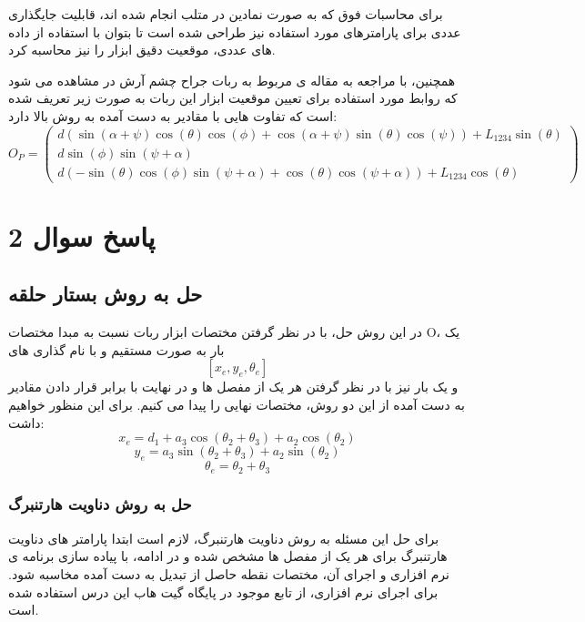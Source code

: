 برای محاسبات فوق که به صورت نمادین در متلب انجام شده اند، قابلیت جایگذاری عددی برای پارامترهای مورد استفاده نیز طراحی شده است تا بتوان با استفاده از داده های عددی، موقعیت دقیق ابزار را نیز محاسبه کرد.

همچنین، با مراجعه به مقاله ی مربوط به ربات جراح چشم آرش در \cite{hassani2021kinematic} مشاهده می شود که روابط مورد استفاده برای تعیین موقعیت ابزار این ربات به صورت زیر تعریف شده است که تفاوت هایی با مقادیر به دست آمده به روش بالا دارد:
\[
O_P = 
\begin{pmatrix}
	d \left( \sin(\alpha + \psi) \cos(\theta) \cos(\phi) + \cos(\alpha + \psi) \sin(\theta) \cos(\psi) \right) + L_{1234} \sin(\theta) \\
	d \sin(\phi) \sin(\psi + \alpha) \\
	d \left( -\sin(\theta) \cos(\phi) \sin(\psi + \alpha) + \cos(\theta) \cos(\psi + \alpha) \right) + L_{1234} \cos(\theta)
\end{pmatrix}
\]


\section{ پاسخ سوال 2}
\subsection{حل به روش بستار حلقه}

در این روش حل، با در نظر گرفتن مختصات ابزار ربات نسبت به مبدا مختصات O، یک بار به صورت مستقیم و با نام گذاری های 
\[
[x_e, y_e, \theta_e]
\]
 و یک بار نیز با در نظر گرفتن هر یک از مفصل ها و در نهایت با برابر قرار دادن مقادیر به دست آمده از این دو روش، مختصات نهایی را پیدا می کنیم.
 برای این منظور خواهیم داشت:
 \[
 x_e = d_1 + a_3 \cos(\theta_2 + \theta_3) + a_2 \cos(\theta_2)
 \]
 \[
 y_e = a_3 \sin(\theta_2 + \theta_3) + a_2 \sin(\theta_2)
 \]
 \[
 \theta_e = \theta_2 + \theta_3
 \]
 
 \subsubsection{حل به روش دناویت هارتنبرگ}
 برای حل این مسئله به روش دناویت هارتنبرگ، لازم است ابتدا پارامتر های دناویت هارتنبرگ برای هر یک از مفصل ها مشخص شده و در ادامه، با پیاده سازی برنامه ی نرم افزاری و اجرای آن، مختصات نقطه حاصل از تبدیل به دست آمده مخاسبه شود. برای اجرای نرم افزاری، از تابع موجود در پایگاه گیت هاب این درس استفاده شده است.

